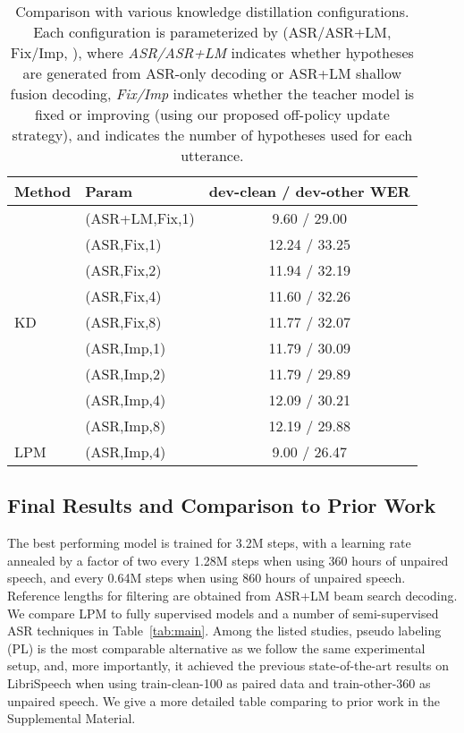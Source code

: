 \begin{table}[ht]
    \small
    \caption{Comparison with various knowledge distillation configurations. Each configuration is parameterized by (ASR/ASR+LM, Fix/Imp, ), where \emph{ASR/ASR+LM} indicates whether hypotheses are generated from ASR-only decoding or ASR+LM shallow fusion decoding, \emph{Fix/Imp} indicates whether the teacher model is fixed or improving (using our proposed off-policy update strategy), and  indicates the number of hypotheses used for each utterance.}
    \label{tab:kd}
    \begin{center}
    \begin{tabular}{llc}
      \toprule
      Method & Param & dev-clean / dev-other WER \\
      \midrule
      \multirow{9}{*}{KD}
      & (ASR+LM,Fix,1) &  9.60 / 29.00 \\
      \cmidrule{2-3}
& (ASR,Fix,1)   &  12.24 / 33.25 \\
      & (ASR,Fix,2)   &  11.94 / 32.19 \\
      & (ASR,Fix,4)   &  11.60 / 32.26 \\
      & (ASR,Fix,8)   &  11.77 / 32.07 \\
      \cmidrule{2-3}
& (ASR,Imp,1)   &  11.79 / 30.09 \\
      & (ASR,Imp,2)   &  11.79 / 29.89 \\
      & (ASR,Imp,4)   &  12.09 / 30.21 \\
      & (ASR,Imp,8)   &  12.19 / 29.88 \\
      \midrule 
      LPM & (ASR,Imp,4) &   9.00 / 26.47\\
      \bottomrule
    \end{tabular}
    \end{center}
\end{table}



\subsection{Final Results and Comparison to Prior Work}
The best performing model is trained for 3.2M steps, with a learning rate annealed by a factor of two every 1.28M steps when using 360 hours of unpaired speech, and every 0.64M steps when using 860 hours of unpaired speech.
Reference lengths for filtering are obtained from ASR+LM beam search decoding.
We compare LPM to fully supervised models and a number of semi-supervised ASR techniques in Table~\ref{tab:main}.
Among the listed studies, pseudo labeling (PL) is the most comparable alternative as we follow the same experimental setup, and, more importantly, it achieved the previous state-of-the-art results on LibriSpeech when using train-clean-100 as paired data and train-other-360 as unpaired speech. 
We give a more detailed table comparing to prior work in the Supplemental Material.

